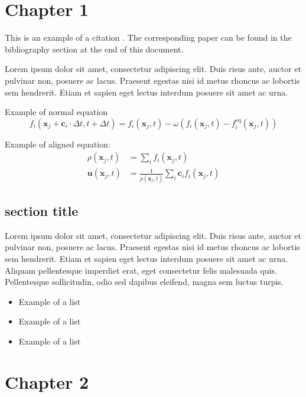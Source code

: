\chapter{Chapter 1}

This is an example of a citation \cite{timm2016lattice}.
The corresponding paper can be found in the bibliography section at the end of this document.

Lorem ipsum dolor sit amet, consectetur adipiscing elit.
Duis risus ante, auctor et pulvinar non, posuere ac lacus. Praesent egestas nisi id metus rhoncus ac lobortis sem hendrerit. Etiam et sapien eget lectus interdum posuere sit amet ac urna.

Example of normal equation
\begin{equation}
    \label{eq:LBE}
    f_i(\mathbf{x}_j+\mathbf{c}_i\cdot\Delta t,t+\Delta t)=f_i(\mathbf{x}_j,t)
    -\omega \left( f_i(\mathbf{x}_j,t)-f_i^\text{eq}(\mathbf{x}_j,t) \right)
\end{equation}

Example of aligned equation:
\begin{align}
    \rho(\mathbf{x}_j, t) &= \sum_i f_i(\mathbf{x}_j, t) \\
    \mathbf{u}(\mathbf{x}_j, t) &= \frac{1}{ \rho(\mathbf{x}_j, t)}
    \sum_i \mathbf{c}_i f_i(\mathbf{x}_j, t)
\end{align}


\section{section title}
Lorem ipsum dolor sit amet, consectetur adipiscing elit. Duis risus ante, auctor et pulvinar non, posuere ac lacus. Praesent egestas nisi id metus rhoncus ac lobortis sem hendrerit. Etiam et sapien eget lectus interdum posuere sit amet ac urna. Aliquam pellentesque imperdiet erat, eget consectetur felis malesuada quis. Pellentesque sollicitudin, odio sed dapibus eleifend, magna sem luctus turpis.

\begin{itemize}
    \item Example of a list
    \item Example of a list
    \item Example of a list
\end{itemize}


\chapter{Chapter 2}

